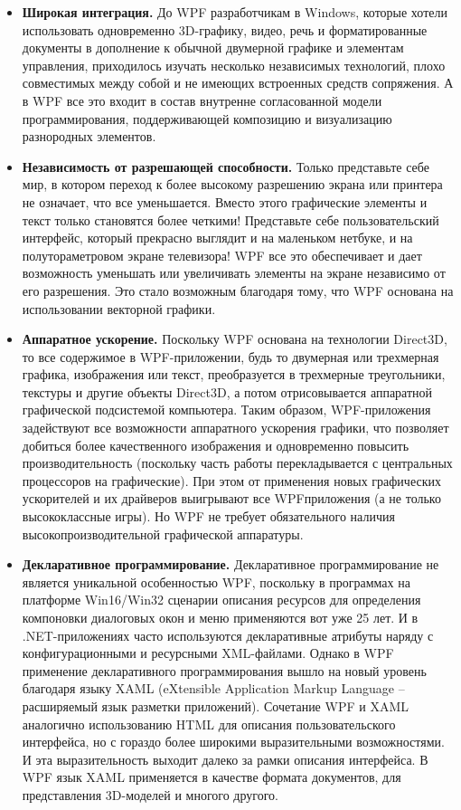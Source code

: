 \documentclass[a4paper,14pt]{extarticle}
\begin{document}
\begin{itemize}
    \item \textbf{Широкая интеграция.} До WPF разработчикам в Windows, которые хотели использовать
    одновременно 3D-графику, видео, речь и форматированные документы в дополнение к обычной
    двумерной графике и элементам управления, приходилось изучать несколько независимых
    технологий, плохо совместимых между собой и не имеющих встроенных средств сопряжения.
    А в WPF все это входит в состав внутренне согласованной модели программирования,
    поддерживающей композицию и визуализацию разнородных элементов.

    \item \textbf{Независимость от разрешающей способности.} Только представьте себе
    мир, в котором переход к более высокому разрешению экрана или принтера не означает,
    что все уменьшается. Вместо этого графические элементы и текст только становятся более
    четкими! Представьте себе пользовательский интерфейс, который прекрасно выглядит и на
    маленьком нетбуке, и на полутораметровом экране телевизора! WPF все это обеспечивает
    и дает возможность уменьшать или увеличивать элементы на экране независимо от его
    разрешения. Это стало возможным благодаря тому, что WPF основана на использовании
    векторной графики.

    \item \textbf{Аппаратное ускорение.} Поскольку WPF основана на технологии Direct3D,
    то все содержимое в WPF-приложении, будь то двумерная или трехмерная графика,
    изображения или текст, преобразуется в трехмерные треугольники, текстуры и другие
    объекты Direct3D, а потом отрисовывается аппаратной графической подсистемой компьютера.
    Таким образом, WPF-приложения задействуют все возможности аппаратного ускорения графики,
    что позволяет добиться более качественного изображения и одновременно повысить
    производительность (поскольку часть работы перекладывается с центральных процессоров
    на графические). При этом от применения новых графических ускорителей и их драйверов
    выигрывают все WPFприложения (а не только высококлассные игры). Но WPF не требует
    обязательного наличия высокопроизводительной графической аппаратуры.

    \item \textbf{Декларативное программирование.} Декларативное программирование не
    является уникальной особенностью WPF, поскольку в программах на платформе
    Win16/Win32 сценарии описания ресурсов для определения компоновки диалоговых окон и меню
    применяются вот уже 25 лет. И в .NET-приложениях часто используются декларативные
    атрибуты наряду с конфигурационными и ресурсными XML-файлами. Однако в WPF применение
    декларативного программирования вышло на новый уровень благодаря языку XAML (eXtensible
    Application Markup Language – расширяемый язык разметки приложений). Сочетание WPF и XAML
    аналогично использованию HTML для описания пользовательского интерфейса, но с гораздо более
    широкими выразительными возможностями. И эта выразительность выходит далеко за рамки
    описания интерфейса. В WPF язык XAML применяется в качестве формата документов, для
    представления 3D-моделей и многого другого.


\end{itemize}
\end{document}
